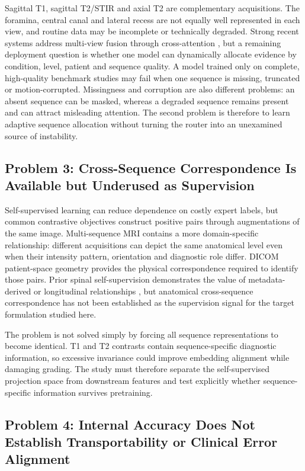Sagittal T1, sagittal T2/STIR and axial T2 are complementary acquisitions. The
foramina, central canal and lateral recess are not equally well represented in each
view, and routine data may be incomplete or technically degraded. Strong recent
systems address multi-view fusion through cross-attention
\cite{batra2025mscan,nguyen2026crossspine}, but a remaining deployment question is
whether one model can dynamically allocate evidence by condition, level, patient and
sequence quality. A model trained only on complete, high-quality benchmark studies
may fail when one sequence is missing, truncated or motion-corrupted. Missingness
and corruption are also different problems: an absent sequence can be masked,
whereas a degraded sequence remains present and can attract misleading attention.
The second problem is therefore to learn adaptive sequence allocation without
turning the router into an unexamined source of instability.

\subsection{Problem 3: Cross-Sequence Correspondence Is Available but Underused as Supervision}
\label{sec:intro-problem-ssl}

Self-supervised learning can reduce dependence on costly expert labels, but common
contrastive objectives construct positive pairs through augmentations of the same
image. Multi-sequence MRI contains a more domain-specific relationship: different
acquisitions can depict the same anatomical level even when their intensity pattern,
orientation and diagnostic role differ. DICOM patient-space geometry provides the
physical correspondence required to identify those pairs. Prior spinal
self-supervision demonstrates the value of metadata-derived or longitudinal
relationships \cite{jamaludin2017selfsupervised}, but anatomical cross-sequence
correspondence has not been established as the supervision signal for the target
formulation studied here.

The problem is not solved simply by forcing all sequence representations to become
identical. T1 and T2 contrasts contain sequence-specific diagnostic information, so
excessive invariance could improve embedding alignment while damaging grading. The
study must therefore separate the self-supervised projection space from downstream
features and test explicitly whether sequence-specific information survives
pretraining.

\subsection{Problem 4: Internal Accuracy Does Not Establish Transportability or Clinical Error Alignment}
\label{sec:intro-problem-transfer}

